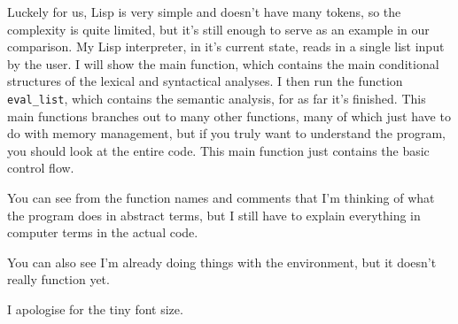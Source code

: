 \documentclass[11pt]{article}
\begin{document}
Luckely for us, Lisp is very simple and doesn't have many tokens, so the
complexity is quite limited, but it's still enough to serve as an example in
our comparison. My Lisp interpreter, in it's current state, reads in a single
list input by the user. I will show the main function, which contains the main
conditional structures of the lexical and syntactical analyses. I then run the
function \texttt{eval\_list}, which contains the semantic analysis, for as far
it's finished. This main functions branches out to many other functions, many
of which just have to do with memory management, but if you truly want to
understand the program, you should look at the entire code. This main function
just contains the basic control flow.

You can see from the function names and comments that I'm thinking of what the
program does in abstract terms, but I still have to explain everything in
computer terms in the actual code.

You can also see I'm already doing things with the environment, but it doesn't
really function yet.

I apologise for the tiny font size.
\end{document}
